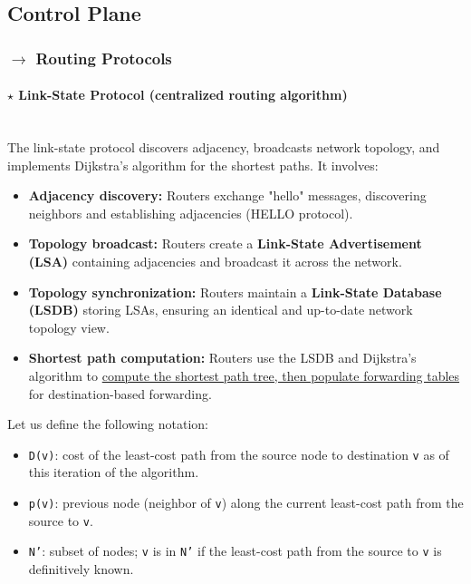 \clearpage
\subsection[4.3 Control Plane]{\hspace*{0.075 em}\raisebox{0.2 em}{$\pmb{\drsh}$} Control Plane}
\label{subsec:control-plane}

\subsubsection[4.3.1 Routing Protocols]{$\rightarrow$ Routing Protocols}
\label{subsubsec:routing-protocols}

\paragraph[4.3.1.1 Link-State Protocol]{$\pmb{\star}$ Link-State Protocol (centralized routing algorithm)}\mbox{}\\[4pt]
The link-state protocol discovers adjacency, broadcasts network topology, and implements Dijkstra's algorithm for the shortest paths. It involves:

\begin{itemize}
    \item \textbf{Adjacency discovery:} Routers exchange "hello" messages, discovering neighbors and establishing adjacencies (HELLO protocol).
    
    \item \textbf{Topology broadcast:} Routers create a \textbf{Link-State Advertisement (LSA)} containing adjacencies and broadcast it across the network.
    
    \item \textbf{Topology synchronization:} Routers maintain a \textbf{Link-State Database (LSDB)} storing LSAs, ensuring an identical and up-to-date network topology view.
    
    \item \textbf{Shortest path computation:} Routers use the LSDB and Dijkstra's algorithm to \underline{compute the shortest path tree, then populate forwarding tables} for destination-based forwarding.
\end{itemize}

\noindent Let us define the following notation:
\begin{itemize}[noitemsep, nolistsep]
    \item \texttt{D(v)}: cost of the least-cost path from the source node to destination \texttt{v} as of this
    iteration of the algorithm.
    \item \texttt{p(v)}: previous node (neighbor of \texttt{v}) along the current least-cost path from the
    source to \texttt{v}.
    \item \texttt{N'}: subset of nodes; \texttt{v} is in \texttt{N'} if the least-cost path from the source to \texttt{v} is definitively known.
\end{itemize}


